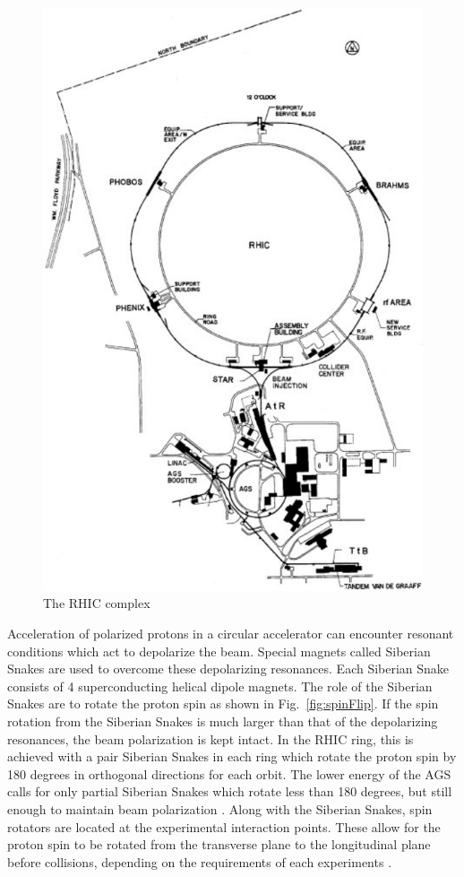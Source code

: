 \documentclass[letterpaper, abstract = on,listof=totoc, bibliography=totoc]{scrreprt}
\begin{document}
 \begin{figure}
\begin{center}
\includegraphics[width = 1\textwidth]{rhicBNL}
\caption[The RHIC complex]{The RHIC complex}
\label{fig:rhic}
\end{center}
\end{figure}
Acceleration of polarized protons in a circular accelerator can encounter resonant conditions which act to depolarize the beam. Special magnets called Siberian Snakes are used to overcome these depolarizing resonances. Each Siberian Snake consists of 4 superconducting helical dipole magnets. The role of the Siberian Snakes are to rotate the proton spin as shown in Fig.~\ref{fig:spinFlip}. If the spin rotation from the Siberian Snakes is much larger than that of the depolarizing resonances, the beam polarization is kept intact. In the RHIC ring, this is achieved with a pair Siberian Snakes in each ring which rotate the proton spin by 180 degrees in orthogonal directions for each orbit. The lower energy of the AGS calls for only partial Siberian Snakes which rotate less than 180 degrees, but still enough to maintain beam polarization \cite{ppCollider}.
Along with the Siberian Snakes, spin rotators are located at the experimental interaction points. These allow for the proton spin to be rotated from the transverse plane to the longitudinal plane before collisions, depending on the requirements of each  experiments \cite{ppCollider}.
\end{document}
